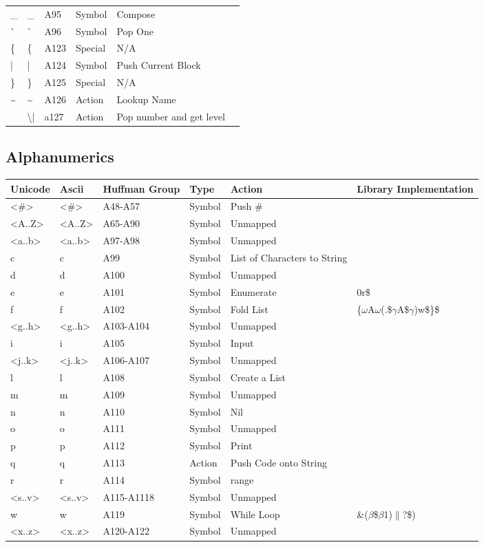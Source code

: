 \documentclass{article}
\newcommand\escape\textbackslash
\begin{document}
\begin{tabular}{| >{\ttfamily}l| >{\ttfamily}l| >{\ttfamily}l|l|l| >{\ttfamily}l|}
    \_ & \_ & A95 & Symbol & Compose & \\
    \`{} & \`{} & A96 & Symbol & Pop One & \\
    \{ & \{ & A123 & Special & N/A & \\
    | & | & A124 & Symbol & Push Current Block &\\
    \} & \} & A125 & Special & N/A & \\
    \textasciitilde & \textasciitilde & A126 & Action & Lookup Name\\
    \textbrokenbar{} & \escape{|} & a127 & Action & Pop number and get level &\\
    \hline
\end{tabular}

\subsection{Alphanumerics}

\begin{tabular}{| >{\ttfamily}l| >{\ttfamily}l| >{\ttfamily}l|l|l| >{\ttfamily}l|}
    \hline
    \textbf{Unicode} & \textbf{Ascii} & \textbf{Huffman Group}& \textbf{Type} & \textbf{Action} & \textbf{Library Implementation}\\
    \hline
    <\#> & <\#> & A48-A57 & Symbol & Push \# & \\
    <A..Z> & <A..Z> & A65-A90 & Symbol & Unmapped & \\
    <a..b> & <a..b> & A97-A98 & Symbol & Unmapped & \\
    c & c & A99 & Symbol & List of Characters to String & \\
    d & d & A100 & Symbol & Unmapped & \\
    e & e & A101 & Symbol & Enumerate & 0r\$\\
    f & f & A102 & Symbol & Fold List & \{$\omega$A\@$\omega$(.\$$\gamma$A\$$\gamma$)w\$\}\$\\
    <g..h> & <g..h> & A103-A104 & Symbol & Unmapped & \\
    i & i & A105 & Symbol & Input & \\
    <j..k> & <j..k> & A106-A107 & Symbol & Unmapped & \\
    l & l & A108 & Symbol & Create a List & \\
    m & m & A109 & Symbol & Unmapped & \\
    n & n & A110 & Symbol & Nil & \\
    o & o & A111 & Symbol & Unmapped & \\
    p & p & A112 & Symbol & Print & \\
    q & q & A113 & Action & Push Code onto String & \\
    r & r & A114 & Symbol & range & \\
    <s..v> & <s..v> & A115-A1118 & Symbol & Unmapped & \\
    w & w & A119 & Symbol & While Loop & 1\&($\beta$\$$\beta$1\textbrokenbar{})$\parallel$?\$)\\
    <x..z> & <x..z> & A120-A122 & Symbol & Unmapped & \\
    \hline
\end{tabular}
\end{document}
